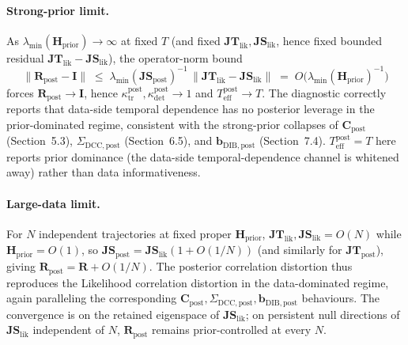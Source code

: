 \documentclass[11pt]{article}
\begin{document}
\paragraph{Strong-prior limit.}
As $\lambda_{\min}(\mathbf H_{\mathrm{prior}}) \to \infty$ at fixed $T$ (and fixed $\mathbf{JT}_{\mathrm{lik}}, \mathbf{JS}_{\mathrm{lik}}$, hence fixed bounded residual $\mathbf{JT}_{\mathrm{lik}} - \mathbf{JS}_{\mathrm{lik}}$), the operator-norm bound
\begin{equation}
\|\mathbf R_{\mathrm{post}} - \mathbf I\|
\;\leq\;
\lambda_{\min}(\mathbf{JS}_{\mathrm{post}})^{-1}\,
\bigl\|\mathbf{JT}_{\mathrm{lik}} - \mathbf{JS}_{\mathrm{lik}}\bigr\|
\;=\;
O\!\bigl(\lambda_{\min}(\mathbf H_{\mathrm{prior}})^{-1}\bigr)
\label{eq:posterior-r-strong-bound}
\end{equation}
forces $\mathbf R_{\mathrm{post}} \to \mathbf I$, hence $\kappa_{\mathrm{tr}}^{\mathrm{post}}, \kappa_{\mathrm{det}}^{\mathrm{post}} \to 1$ and $T_{\mathrm{eff}}^{\mathrm{post}} \to T$. The diagnostic correctly reports that data-side temporal dependence has no posterior leverage in the prior-dominated regime, consistent with the strong-prior collapses of $\mathbf C_{\mathrm{post}}$ (Section~5.3), $\Sigma_{\mathrm{DCC},\mathrm{post}}$ (Section~6.5), and $\mathbf b_{\mathrm{DIB},\mathrm{post}}$ (Section~7.4). $T_{\mathrm{eff}}^{\mathrm{post}} = T$ here reports prior dominance (the data-side temporal-dependence channel is whitened away) rather than data informativeness.

\paragraph{Large-data limit.}
For $N$ independent trajectories at fixed proper $\mathbf H_{\mathrm{prior}}$, $\mathbf{JT}_{\mathrm{lik}}, \mathbf{JS}_{\mathrm{lik}} = O(N)$ while $\mathbf H_{\mathrm{prior}} = O(1)$, so $\mathbf{JS}_{\mathrm{post}} = \mathbf{JS}_{\mathrm{lik}}(1 + O(1/N))$ (and similarly for $\mathbf{JT}_{\mathrm{post}}$), giving $\mathbf R_{\mathrm{post}} = \mathbf R + O(1/N)$. The posterior correlation distortion thus reproduces the Likelihood correlation distortion in the data-dominated regime, again paralleling the corresponding $\mathbf C_{\mathrm{post}}, \Sigma_{\mathrm{DCC},\mathrm{post}}, \mathbf b_{\mathrm{DIB},\mathrm{post}}$ behaviours. The convergence is on the retained eigenspace of $\mathbf{JS}_{\mathrm{lik}}$; on persistent null directions of $\mathbf{JS}_{\mathrm{lik}}$ independent of $N$, $\mathbf R_{\mathrm{post}}$ remains prior-controlled at every $N$.
\end{document}
